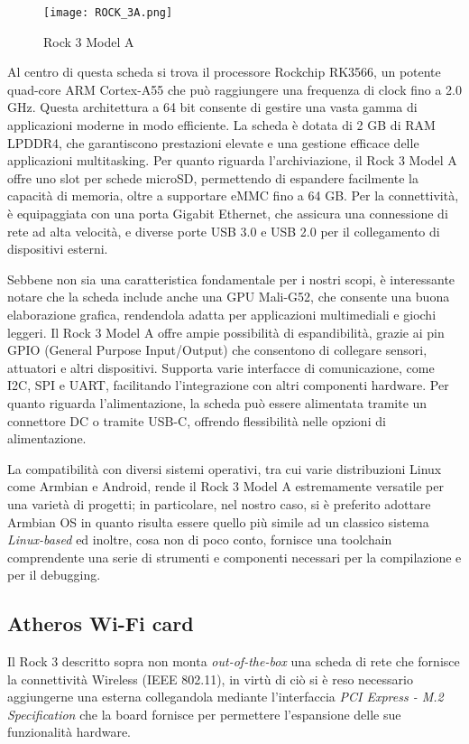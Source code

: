 \begin{figure}[h!]
    \centering
    \texttt{[image: ROCK\_3A.png]}
    \caption{Rock 3 Model A}
    \label{fig:rock}
\end{figure}

Al centro di questa scheda si trova il processore Rockchip RK3566, un potente quad-core ARM Cortex-A55 che può raggiungere una frequenza di clock fino a 2.0 GHz. Questa architettura a 64 bit consente di gestire una vasta gamma di applicazioni moderne in modo efficiente. La scheda è dotata di 2 GB di RAM LPDDR4, che garantiscono prestazioni elevate e una gestione efficace delle applicazioni multitasking. Per quanto riguarda l'archiviazione, il Rock 3 Model A offre uno slot per schede microSD, permettendo di espandere facilmente la capacità di memoria, oltre a supportare eMMC fino a 64 GB. Per la connettività, è equipaggiata con una porta Gigabit Ethernet, che assicura una connessione di rete ad alta velocità, e diverse porte USB 3.0 e USB 2.0 per il collegamento di dispositivi esterni. 

Sebbene non sia una caratteristica fondamentale per i nostri scopi, è interessante notare che la scheda include anche una GPU Mali-G52, che consente una buona elaborazione grafica, rendendola adatta per applicazioni multimediali e giochi leggeri. Il Rock 3 Model A offre ampie possibilità di espandibilità, grazie ai pin GPIO (General Purpose Input/Output) che consentono di collegare sensori, attuatori e altri dispositivi. Supporta varie interfacce di comunicazione, come I2C, SPI e UART, facilitando l'integrazione con altri componenti hardware. Per quanto riguarda l'alimentazione, la scheda può essere alimentata tramite un connettore DC o tramite USB-C, offrendo flessibilità nelle opzioni di alimentazione.

La compatibilità con diversi sistemi operativi, tra cui varie distribuzioni Linux come Armbian e Android, rende il Rock 3 Model A estremamente versatile per una varietà di progetti; in particolare, nel nostro caso, si è preferito adottare Armbian OS in quanto risulta essere quello più simile ad un classico sistema \textit{Linux-based} ed inoltre, cosa non di poco conto, fornisce una toolchain comprendente una serie di strumenti e componenti necessari per la compilazione e per il debugging.

\subsection[Atheros Wi-Fi card]{Atheros Wi-Fi card}
Il Rock 3 descritto sopra non monta \textit{out-of-the-box} una scheda di rete che fornisce la connettività Wireless (IEEE 802.11), in virtù di ciò si è reso necessario aggiungerne una esterna collegandola mediante l'interfaccia \textit{PCI Express - M.2 Specification} che la board fornisce per permettere l'espansione delle sue funzionalità hardware.

